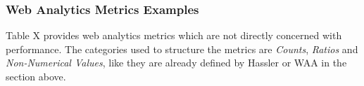 

\subsubsection{Web Analytics Metrics Examples}


Table X provides web analytics metrics which are not directly concerned with performance.
The categories used to structure the metrics are \textit{Counts}, \textit{Ratios} and \textit{Non-Numerical Values}, like they are already defined by Hassler or WAA in the section above. %





